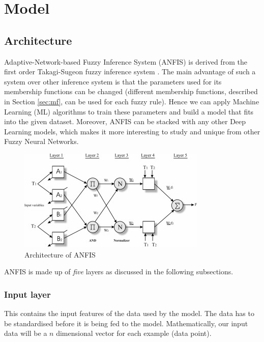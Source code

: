 \documentclass[11pt,a4paper]{article}
\begin{document}
\section{Model}
\subsection{Architecture}
Adaptive-Network-based Fuzzy Inference System (ANFIS) is derived from the first order Takagi-Sugeon fuzzy inference system \cite{Sugeno}. The main advantage of such a system over other inference system is that the parameters used for its membership functions can be changed (different membership functions, described in Section \ref{sec:mf}, can be used for each fuzzy rule). Hence we can apply Machine Learning (ML) algorithms to train these parameters and build a model that fits into the given dataset. Moreover, ANFIS can be stacked with any other Deep Learning models, which makes it more interesting to study and unique from other Fuzzy Neural Networks.

\begin{figure}[htbp]
\includegraphics[width=\columnwidth]{arch1.jpg}
\caption{\label{fig:arch1} Architecture of ANFIS}
\end{figure}

ANFIS is made up of \textit{five} layers as discussed in the following subsections.
\subsubsection{Input layer}
This contains the input features of the data used by the model. The data has to be standardised before it is being fed to the model. Mathematically, our input data will be a $n$ dimensional vector for each example (data point).
\end{document}
